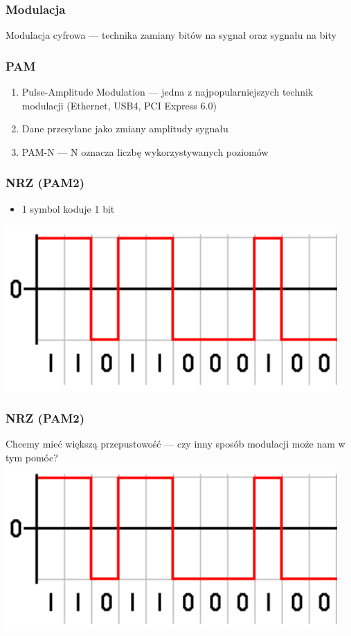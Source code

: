 \documentclass{beamer}
\begin{document}
\begin{frame}
\frametitle{Modulacja}
Modulacja cyfrowa --- technika zamiany bitów na sygnał oraz sygnału na bity
\end{frame}

\begin{frame}
\frametitle{PAM}
\begin{enumerate}
    \item Pulse-Amplitude Modulation --- jedna z najpopularniejszych technik modulacji (Ethernet, USB4, PCI Express 6.0)
    \item Dane przesyłane jako zmiany amplitudy sygnału
    \item PAM-N --- N oznacza liczbę wykorzystywanych poziomów
\end{enumerate}
\end{frame}

\begin{frame}
\frametitle{NRZ (PAM2)}
\begin{itemize}
    \item 1 symbol koduje 1 bit
\end{itemize}
\includegraphics[width=0.95\textwidth]{images/nrz_code.png}
\end{frame}

\begin{frame}
\frametitle{NRZ (PAM2)}
Chcemy mieć większą przepustowość --- czy inny sposób modulacji może nam w tym pomóc?
\includegraphics[width=0.95\textwidth]{images/nrz_code.png}
\end{frame}
\end{document}
